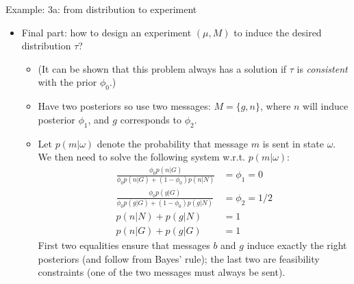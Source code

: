 \documentclass[english,10pt
,aspectratio=169
]{beamer}
\begin{document}
\begin{frame}{Example: 3a: from distribution to experiment}
\begin{itemize}
	\item Final part: how to design \alert{an experiment} $(\mu,M)$ to induce the desired distribution $\tau$? 
	\begin{itemize}
		\item (It can be shown that this problem always has a solution if $\tau$ is \emph{consistent} with the prior $\phi_0$.)
		\item Have two posteriors so use two messages: $M = \{g,n\}$, where $n$ will induce posterior $\phi_1$, and $g$ corresponds to $\phi_2$.
		\item Let $p(m|\omega)$ denote the probability that message $m$ is sent in state $\omega$. We then need to solve the following system w.r.t. $p(m|\omega)$:
		\begin{align*}
			\frac{\phi_0 p(n|G)}{\phi_0 p(n|G) + (1-\phi_0) p(n|N)} &= \phi_1 = 0
			\\
			\frac{\phi_0 p(g|G)}{\phi_0 p(g|G) + (1-\phi_0) p(g|N)} &= \phi_2 = 1/2
			\\
			p(n|N) + p(g|N) &= 1
			\\
			p(n|G) + p(g|G) &= 1
		\end{align*}
		First two equalities ensure that messages $b$ and $g$ induce exactly the right posteriors (and follow from Bayes' rule); the last two are feasibility constraints (one of the two messages must always be sent).
	\end{itemize}
\end{itemize}
\end{frame}
\end{document}
